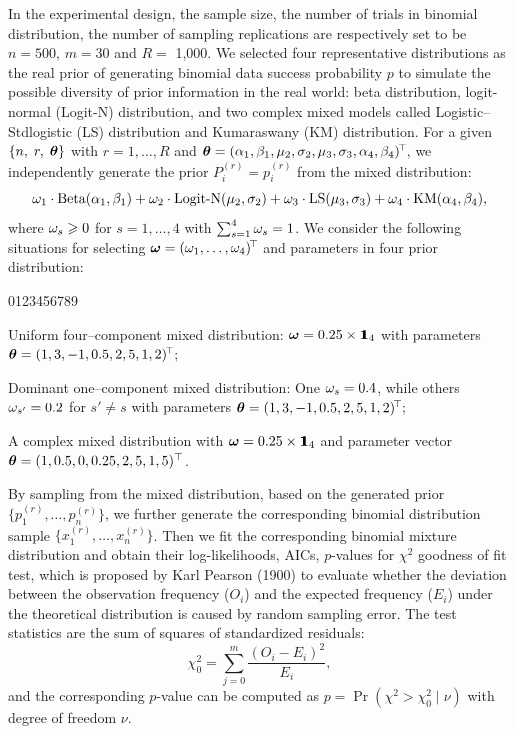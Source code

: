 In the experimental design, the sample size, the number of trials in binomial distribution, the number of sampling replications are respectively set to be $n = 500$, $m = 30$ and $R=$ 1,000. We selected four representative distributions as the real prior of generating binomial data success probability $p$ to simulate the possible diversity of prior information in the real world: beta distribution, logit-normal (Logit-N) distribution, and two complex mixed models called Logistic--Stdlogistic (LS) distribution and Kumaraswany (KM) distribution. For a given $\{n, \; r, \; {\boldsymbol{\theta}}\}$ with $r = 1, \ldots, R$ and ${\boldsymbol{\theta}} = (\alpha_1, \beta_1, \mu_2, \sigma_2, \mu_3, \sigma_3, \alpha_4, \beta_4)^{\!\top\!}$, we independently generate the prior $P_i^{(r)}=p_i^{(r)}$ from the mixed distribution:
$$
    \omega_1 \cdot \mbox{Beta}(\alpha_1,\beta_1) + \omega_2 \cdot \mbox{Logit-N}(\mu_2,\sigma_2) + \omega_3 \cdot \mbox{LS}(\mu_3,\sigma_3) + \omega_4 \cdot \mbox{KM}(\alpha_4,\beta_4),
$$
where $\omega_s \geqslant 0$ for $s = 1, \dots, 4$ with $\sum_{s=1}^4 \omega_s = 1$. We consider the following situations for selecting ${\mbox{\boldmath$\omega$}} = (\omega_1, \dots, \omega_4)^{\!\top\!}$ and parameters in four prior distribution:
\begin{namelist}{0123456789}

\item[\hspace*{-0.05cm} Case ($\mbox{B}_1$):] Uniform four–component mixed distribution: ${\mbox{\boldmath$\omega$}} = 0.25 \times {\bf 1}\!\!\!{\bf 1}_4$ with parameters ${\boldsymbol{\theta}} = (1, 3, -1, 0.5, 2, 5, 1, 2)^{\!\top\!}$;

\item[\hspace*{-0.05cm} Case ($\mbox{B}_2$):] Dominant one–component mixed distribution: One $\omega_s = 0.4$, while others $\omega_{s'} = 0.2$ for $s' \ne s$ with parameters ${\boldsymbol{\theta}} = (1, 3, -1, 0.5, 2, 5, 1, 2)^{\!\top\!}$;

\item[\hspace*{-0.05cm} Case ($\mbox{B}_3$):] A complex mixed distribution with ${\mbox{\boldmath$\omega$}} = 0.25 \times {\bf 1}\!\!\!{\bf 1}_4$ and parameter vector ${\boldsymbol{\theta}} = (1, 0.5, 0, 0.25, 2, 5, 1, 5)^\top$.
\end{namelist}
By sampling from the mixed distribution, based on the generated prior $\{p_1^{(r)}, \dots, p_n^{(r)}\}$, we further generate the corresponding binomial distribution sample $\{x_1^{(r)}, \dots, x_n^{(r)}\}$. Then we fit the corresponding binomial mixture distribution and obtain their log-likelihoods, AICs, $p$-values for $\chi^2$ goodness of fit test, which is proposed by Karl Pearson (1900) to evaluate whether the deviation between the observation frequency ($O_i$) and the expected frequency ($E_i$) under the theoretical distribution is caused by random sampling error. The test statistics are the sum of squares of standardized residuals:
$$
    \chi_0^2 = \sum_{j = 0}^m \frac{(O_i - E_i)^2}{E_i},
$$
and the corresponding $p$-value can be computed as $p = \Pr(\chi^2 > \chi_0^2 \; | \;\nu)$ with degree of freedom $\nu$.

